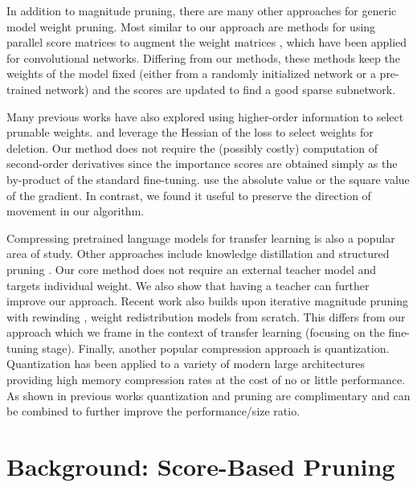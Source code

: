 \documentclass{article}
\begin{document}
In addition to magnitude pruning, there are many other approaches for generic model weight pruning. Most similar to our approach are methods for using parallel score matrices to augment the weight matrices \citep{Mallya2018PiggybackAM,Ramanujan2019WhatsHI}, which have been applied for convolutional networks. Differing from our methods, these methods keep the weights of the model fixed (either from a randomly initialized network or a pre-trained network) and the scores are updated to find a good sparse subnetwork. 

Many previous works have also explored using higher-order information to select prunable weights. \citet{LeCun1989OptimalBD} and \citet{Hassibi1993OptimalBS} leverage the Hessian of the loss to select weights for deletion. Our method does not require the (possibly costly) computation of second-order derivatives since the importance scores are obtained simply as the by-product of the standard fine-tuning. \citep{Theis2018FasterGP,Ding2019GlobalSM,Lee2019SNIPSN} use the absolute value or the square value of the gradient. In contrast, we found it useful to preserve the direction of movement in our algorithm.


Compressing pretrained language models for transfer learning 
is also a popular area of study. Other approaches include knowledge distillation \citep{Sanh2019DistilBERTAD,Tang2019DistillingTK} and structured pruning \citep{Fan2019ReducingTD,Sajjad2020PoorMB,Michel2019AreSH,Wang2019StructuredPO}. Our core method does not require an external teacher model and targets individual weight. We also show that having a teacher can further improve our approach. Recent work also builds upon iterative magnitude pruning with rewinding \citep{Yu2019PlayingTL}, weight redistribution \citep{Dettmers2019SparseNF} models from scratch. This differs from our approach which we frame in the context of transfer learning (focusing on the fine-tuning stage).
Finally, another popular compression approach is quantization. Quantization has been applied to a variety of modern large architectures  \citep{fan2020training,Zafrir2019Q8BERTQ8,Gong2014CompressingDC} providing high memory compression rates at the cost of no or little performance. 
As shown in previous works \citep{Li2020TrainLT,Han2016DeepCC} quantization and pruning are complimentary and can be combined to further improve the performance/size ratio. 



\section{Background: Score-Based Pruning}
\label{sec:notation}
\end{document}
